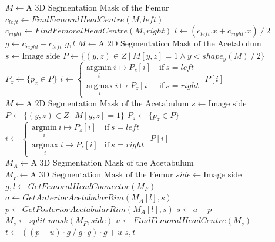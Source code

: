 \documentclass[a4paper,12pt]{article}
\newcommand{\argmax}[1]{\underset{#1}{\mathrm{argmax}}}
\newcommand{\argmin}[1]{\underset{#1}{\mathrm{argmin}}}
\begin{document}
	\begin{algorithm}
		\caption{Acetabular Anteversion Calculation}
		\label{alg:acetabular_anteversion}
		\begin{algorithmic}[1]
				\State $M \gets \text{A 3D Segmentation Mask of the Femur}$
				\State $c_{left} \gets FindFemoralHeadCentre(M, left)$
				\State $c_{right} \gets FindFemoralHeadCentre(M, right)$
				\State $l \gets (c_{left}.x + c_{right}.x) \: / \: 2$
				\State $g \gets c_{right} - c_{left}$
				\State \Return $g, l$
			\EndProcedure
				\State $M \gets \text{A 2D Segmentation Mask of the Acetabulum}$
				\State $s \gets \text{Image side}$
				\State $P \gets \{(y, z) \in Z \: | \: M[y, z] = 1 \land y < shape_y(M) \: / \: 2\}$
				\State $P_z \gets \{p_z \in P\}$
				\State $i \gets
					\begin{cases}
						\argmin{i} \: i \mapsto P_z[i] & \text{if} \: s = left \\
						\argmax{i} \: i \mapsto P_z[i] & \text{if} \: s = right
					\end{cases}
				$
				\State \Return $P[i]$
			\EndProcedure
				\State $M \gets \text{A 2D Segmentation Mask of the Acetabulum}$
				\State $s \gets \text{Image side}$
				\State $P \gets \{(y, z) \in Z \: | \: M[y, z] = 1\}$
				\State $P_z \gets \{p_z \in P\}$
				\State $i \gets
					\begin{cases}
						\argmin{i} \: i \mapsto P_z[i] & \text{if} \: s = left \\
						\argmax{i} \: i \mapsto P_z[i] & \text{if} \: s = right
					\end{cases}
				$
				\State \Return $P[i]$
			\EndProcedure
				\State $M_A \gets \text{A 3D Segmentation Mask of the Acetabulum}$
				\State $M_F \gets \text{A 3D Segmentation Mask of the Femur}$
				\State $side \gets \text{Image side}$
				\State $g, l \gets GetFemoralHeadConnector(M_F)$
				\State $a \gets GetAnteriorAcetabularRim(M_A[l], s)$
				\State $p \gets GetPosteriorAcetabularRim(M_A[l], s)$
				\State $s \gets a - p$
				\State $M_s \gets split\_mask(M_F, side)$
				\State $u \gets FindFemoralHeadCentre(M_s)$
				\State $t \gets ((p - u) \cdot g \: / \: g \cdot g) \cdot g + u$
				\State \Return $s, t$
			\EndProcedure
		\end{algorithmic}
	\end{algorithm}
\end{document}
